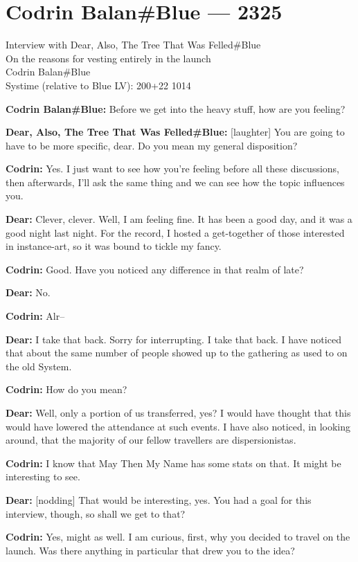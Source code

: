 \hypertarget{codrin-balanblue-2325}{%
\chapter{Codrin Balan\#Blue — 2325}\label{codrin-balanblue-2325}}

Interview with Dear, Also, The Tree That Was Felled\#Blue\\
On the reasons for vesting entirely in the launch\\
Codrin Balan\#Blue\\
Systime (relative to Blue LV): 200+22 1014

\textbf{Codrin Balan\#Blue:} Before we get into the heavy stuff, how are you feeling?

\textbf{Dear, Also, The Tree That Was Felled\#Blue:} {[}laughter{]} You are going to have to be more specific, dear. Do you mean my general disposition?

\textbf{Codrin:} Yes. I just want to see how you're feeling before all these discussions, then afterwards, I'll ask the same thing and we can see how the topic influences you.

\textbf{Dear:} Clever, clever. Well, I am feeling fine. It has been a good day, and it was a good night last night. For the record, I hosted a get-together of those interested in instance-art, so it was bound to tickle my fancy.

\textbf{Codrin:} Good. Have you noticed any difference in that realm of late?

\textbf{Dear:} No.

\textbf{Codrin:} Alr--

\textbf{Dear:} I take that back. Sorry for interrupting. I take that back. I have noticed that about the same number of people showed up to the gathering as used to on the old System.

\textbf{Codrin:} How do you mean?

\textbf{Dear:} Well, only a portion of us transferred, yes? I would have thought that this would have lowered the attendance at such events. I have also noticed, in looking around, that the majority of our fellow travellers are dispersionistas.

\textbf{Codrin:} I know that May Then My Name has some stats on that. It might be interesting to see.

\textbf{Dear:} {[}nodding{]} That would be interesting, yes. You had a goal for this interview, though, so shall we get to that?

\textbf{Codrin:} Yes, might as well. I am curious, first, why you decided to travel on the launch. Was there anything in particular that drew you to the idea?

